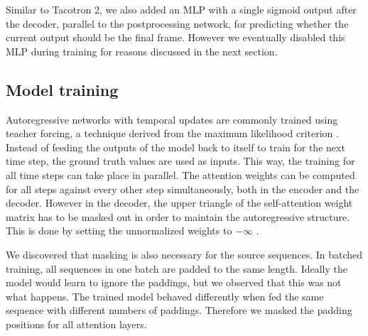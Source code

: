\documentclass[11pt]{article}
\begin{document}
Similar to Tacotron 2,
we also added an MLP with a single sigmoid output after the decoder,
parallel to the postprocessing network,
for predicting whether the current output should be the final frame.
However we eventually disabled this MLP during training
for reasons discussed in the next section.


\subsection{Model training}%
\label{ssec:training}

Autoregressive networks with temporal updates are commonly trained using teacher forcing,
a technique derived from the maximum likelihood criterion \parencite{williams1989learning}.
Instead of feeding the outputs of the model back to itself to train for the next time step,
the ground truth values are used as inputs.
This way, the training for all time steps can take place in parallel.
The attention weights can be computed for all steps against every other step simultaneously,
both in the encoder and the decoder.
However in the decoder, the upper triangle of the self-attention weight matrix has to be masked out
in order to maintain the autoregressive structure.
This is done by setting the unnormalized weights to \(- \infty\) \parencite{vaswani2017attention}.

We discovered that masking is also necessary for the source sequences.
In batched training, all sequences in one batch are padded to the same length.
Ideally the model would learn to ignore the paddings,
but we observed that this was not what happens.
The trained model behaved differently when fed the same sequence with different numbers of paddings.
Therefore we masked the padding positions for all attention layers.
\end{document}
